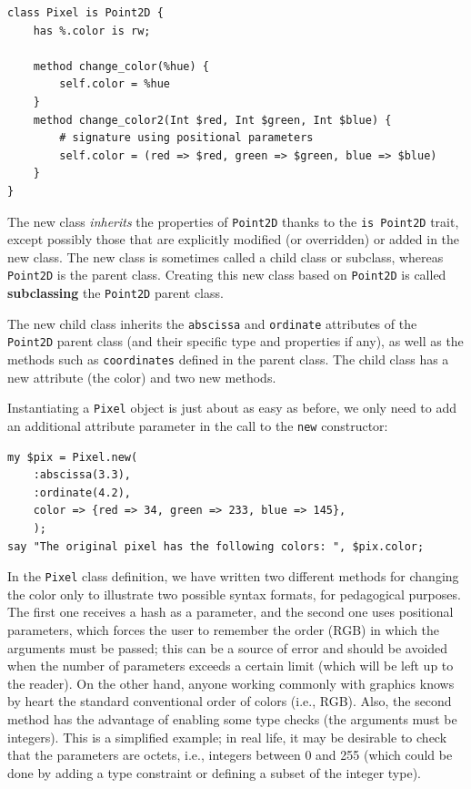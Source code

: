 \begin{verbatim}
class Pixel is Point2D {
    has %.color is rw;

    method change_color(%hue) {
        self.color = %hue
    }
    method change_color2(Int $red, Int $green, Int $blue) {
        # signature using positional parameters
        self.color = (red => $red, green => $green, blue => $blue)
    }
}
\end{verbatim}

The new class \emph{inherits} the properties of {\tt Point2D} 
thanks to the {\tt is Point2D} trait, except possibly those 
that are explicitly modified (or overridden) or added in 
the new class. The new class is sometimes called a 
child class or subclass, whereas {\tt Point2D} is the 
parent class. Creating this new class based on 
{\tt Point2D} is called {\bf subclassing} the {\tt Point2D} 
parent class. 

The new child class inherits the {\tt abscissa} and 
{\tt ordinate} attributes of the {\tt Point2D} parent 
class (and their specific type and properties if any), 
as well as the methods such as {\tt coordinates} defined 
in the parent class. The child class  has a new 
attribute (the color) and two new methods.

Instantiating a {\tt Pixel} object is just about as easy as 
before, we only need to add an additional attribute parameter 
in the call to the {\tt new} constructor:

\begin{verbatim}
my $pix = Pixel.new(
    :abscissa(3.3),
    :ordinate(4.2),
    color => {red => 34, green => 233, blue => 145}, 
    );
say "The original pixel has the following colors: ", $pix.color;
\end{verbatim}

In the {\tt Pixel} class definition, we have written 
two different methods for changing the color 
only to illustrate two possible syntax formats, for pedagogical 
purposes. The first one receives a hash as a parameter, and 
the second one uses positional parameters, which forces 
the user to remember the order (RGB) in which the arguments must 
be passed; this can be a source of error and should be avoided 
when the number of parameters exceeds a certain limit 
(which will be left up to the reader). On the other 
hand, anyone working commonly with graphics knows by heart the 
standard conventional order of colors (i.e., RGB). Also, 
the second method has the 
advantage of enabling some type checks (the arguments must 
be integers). This is a simplified example; in real life, it 
may be desirable to check that the parameters are octets, i.e., 
integers between 0 and 255 (which could be done by adding a 
type constraint or defining a subset of the integer type).

